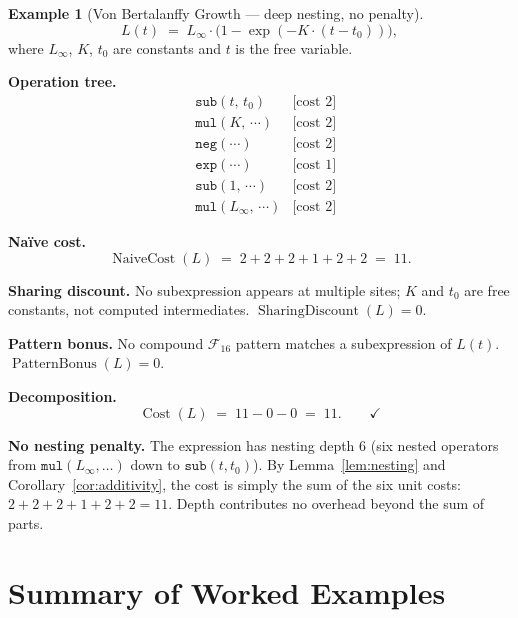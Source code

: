 \documentclass[12pt,a4paper]{article}
\theoremstyle{definition}
\newtheorem{example}[theorem]{Example}
\newcommand{\Cost}{\operatorname{Cost}}
\newcommand{\NC}{\operatorname{NaiveCost}}
\newcommand{\SD}{\operatorname{SharingDiscount}}
\newcommand{\PB}{\operatorname{PatternBonus}}
\begin{document}
\begin{example}[Von Bertalanffy Growth --- deep nesting, no penalty]
\label{ex:vonb}
\[
  L(t) \;=\; L_\infty \cdot \bigl(1 - \exp(-K \cdot (t - t_0))\bigr),
\]
where $L_\infty$, $K$, $t_0$ are constants and $t$ is the free variable.

\textbf{Operation tree.}
\begin{align*}
  & \texttt{sub}(t,\, t_0)                  &\text{[cost 2]} \\
  & \texttt{mul}(K,\, \cdots)               &\text{[cost 2]} \\
  & \texttt{neg}(\cdots)                     &\text{[cost 2]} \\
  & \texttt{exp}(\cdots)                     &\text{[cost 1]} \\
  & \texttt{sub}(1,\, \cdots)               &\text{[cost 2]} \\
  & \texttt{mul}(L_\infty,\, \cdots)        &\text{[cost 2]}
\end{align*}

\textbf{Na\"{i}ve cost.}
\[
  \NC(L) \;=\; 2 + 2 + 2 + 1 + 2 + 2 \;=\; 11.
\]

\textbf{Sharing discount.}
No subexpression appears at multiple sites; $K$ and $t_0$ are free
constants, not computed intermediates.  $\SD(L) = 0$.

\textbf{Pattern bonus.}
No compound $\mathcal{F}_{16}$ pattern matches a subexpression of $L(t)$.
$\PB(L) = 0$.

\textbf{Decomposition.}
\[
  \Cost(L) \;=\; 11 - 0 - 0 \;=\; 11. \qquad \checkmark
\]

\textbf{No nesting penalty.}
The expression has nesting depth 6 (six nested operators from
$\texttt{mul}(L_\infty, \ldots)$ down to $\texttt{sub}(t, t_0)$).
By Lemma~\ref{lem:nesting} and Corollary~\ref{cor:additivity}, the cost
is simply the sum of the six unit costs: $2+2+2+1+2+2 = 11$.
Depth contributes no overhead beyond the sum of parts.
\end{example}

\section{Summary of Worked Examples}
\label{sec:summary-table}
\end{document}
